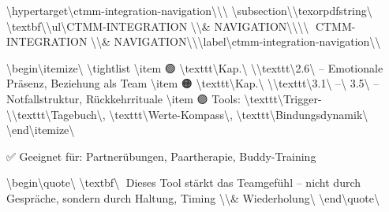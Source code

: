 \textbackslash{}hypertarget\textbackslash{}{ctmm-integration-navigation\textbackslash{}}\textbackslash{}{\textbackslash{}%
\textbackslash{}subsection\textbackslash{}{\textbackslash{}texorpdfstring\textbackslash{}{🧭 \textbackslash{}textbf\textbackslash{}{\textbackslash{}ul\textbackslash{}{CTMM-INTEGRATION \textbackslash{}\textbackslash{}& NAVIGATION\textbackslash{}}\textbackslash{}}\textbackslash{}}\textbackslash{}{🧭 CTMM-INTEGRATION \textbackslash{}\textbackslash{}& NAVIGATION\textbackslash{}}\textbackslash{}}\textbackslash{}label\textbackslash{}{ctmm-integration-navigation\textbackslash{}}\textbackslash{}}

\textbackslash{}begin\textbackslash{}{itemize\textbackslash{}}
\textbackslash{}tightlist
\textbackslash{}item
  🟢 \textbackslash{}texttt\textbackslash{}{Kap.\textbackslash{} \textbackslash{}}\textbackslash{}texttt\textbackslash{}{2.6\textbackslash{}} -- Emotionale Präsenz, Beziehung als Team
\textbackslash{}item
  🟠 \textbackslash{}texttt\textbackslash{}{Kap.\textbackslash{} \textbackslash{}}\textbackslash{}texttt\textbackslash{}{3.1\textbackslash{} –\textbackslash{} 3.5\textbackslash{}} -- Notfallstruktur, Rückkehrrituale
\textbackslash{}item
  🟣 Tools: \textbackslash{}texttt\textbackslash{}{Trigger-\textbackslash{}}\textbackslash{}texttt\textbackslash{}{Tagebuch\textbackslash{}}, \textbackslash{}texttt\textbackslash{}{Werte-Kompass\textbackslash{}}, \textbackslash{}texttt\textbackslash{}{Bindungsdynamik\textbackslash{}}
\textbackslash{}end\textbackslash{}{itemize\textbackslash{}}

✅ Geeignet für: Partnerübungen, Paartherapie, Buddy-Training

\textbackslash{}begin\textbackslash{}{quote\textbackslash{}}
\textbackslash{}textbf\textbackslash{}{📎 Dieses Tool stärkt das Teamgefühl -- nicht durch Gespräche, sondern durch Haltung, Timing \textbackslash{}\textbackslash{}& Wiederholung\textbackslash{}}
\textbackslash{}end\textbackslash{}{quote\textbackslash{}}
